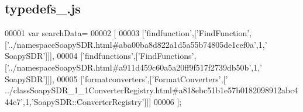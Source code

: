 \subsection{typedefs\+\_.\+js}
\label{typedefs__2_8js_source}

\begin{DoxyCode}
00001 var searchData=
00002 [
00003   [\textcolor{stringliteral}{'findfunction'},[\textcolor{stringliteral}{'FindFunction'},[\textcolor{stringliteral}{'../namespaceSoapySDR.html#aba00ba8d822a1d5a55b74805de1cef0a'},1,\textcolor{stringliteral}{'
      SoapySDR'}]]],
00004   [\textcolor{stringliteral}{'findfunctions'},[\textcolor{stringliteral}{'FindFunctions'},[\textcolor{stringliteral}{'../namespaceSoapySDR.html#a911d459c60a5a20ff9f517f2739db50b'},1,\textcolor{stringliteral}{'
      SoapySDR'}]]],
00005   [\textcolor{stringliteral}{'formatconverters'},[\textcolor{stringliteral}{'FormatConverters'},[\textcolor{stringliteral}{'
      ../classSoapySDR\_1\_1ConverterRegistry.html#a818ebc51b1e57b0182098912abc444e7'},1,\textcolor{stringliteral}{'SoapySDR::ConverterRegistry'}]]]
00006 ];
\end{DoxyCode}
